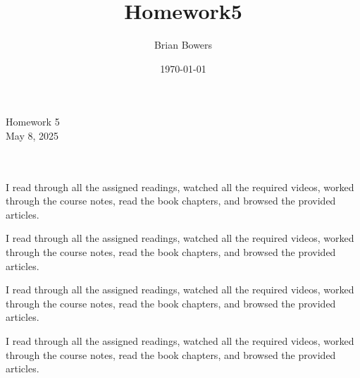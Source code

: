 \documentclass[11pt, letterpaper]{article}
\title{Homework5}
\author{Brian Bowers}
\date{\today}
\begin{document}
\begin{flushright}
    Homework 5 \\
    May 8, 2025
\end{flushright}

\\

 \\

 I read through all the assigned readings, watched all the required videos, worked through the course notes, read the book chapters, and browsed the provided articles.

 I read through all the assigned readings, watched all the required videos, worked through the course notes, read the book chapters, and browsed the provided articles.

 I read through all the assigned readings, watched all the required videos, worked through the course notes, read the book chapters, and browsed the provided articles.

 I read through all the assigned readings, watched all the required videos, worked through the course notes, read the book chapters, and browsed the provided articles. \\
\end{document}
